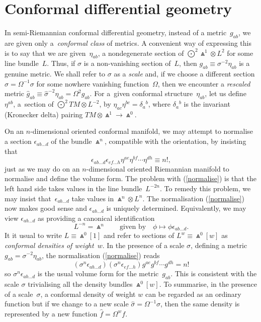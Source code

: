 \documentclass[pdftex]{sigma}%
\numberwithin{equation}{section}
\begin{document}
\section{Conformal differential geometry}\label{conf}
In semi-Riemannian conformal differential geometry, instead of a
metric~$g_{ab}$, we are given only a~{\em conformal class} of metrics. A
convenient way of expressing this is to say that we are given~$\eta_{ab}$, a
nondegenerate section of $\bigodot^2\!\Wedge^1\otimes L^2$ for some line
bundle~$L$. Thus, if $\sigma$ is a non-vanishing section of~$L$, then
$g_{ab}\equiv\sigma^{-2}\eta_{ab}$ is a genuine metric. We shall refer to
$\sigma$ as a {\em scale} and, if we choose a different section
$\widehat\sigma=\Omega^{-1}\sigma$ for some nowhere vanishing
function~$\Omega$, then we encounter a {\em rescaled} metric
$\widehat{g}_{ab}\equiv\widehat\sigma^{-2}\eta_{ab}=\Omega^2g_{ab}$. For a~given conformal structure~$\eta_{ab}$, let us define~$\eta^{ab}$, a~section of
$\bigodot^2\!TM\otimes L^{-2}$, by $\eta_{ac}\eta^{bc}=\delta_a{}^b$, where
$\delta_a{}^b$ is the invariant (Kronecker delta) pairing
$TM\otimes\Wedge^1\to\Wedge^0$.

On an $n$-dimensional oriented conformal manifold, we may attempt to normalise
a section $\epsilon_{ab\dots d}$ of the bundle $\Wedge^n$, compatible
with the orientation, by insisting that
\begin{equation}\label{normalise}
\epsilon_{ab\dots d}\epsilon_{ef\dots h}\eta^{ae}\eta^{bf}\cdots\eta^{dh}
\equiv n! ,\end{equation}
just as we may do on an $n$-dimensional oriented Riemannian manifold to
normalise and define the volume form. The problem with (\ref{normalise}) is
that the left hand side takes values in the line bundle~$L^{-2n}$. To remedy
this problem, we may insist that~$\epsilon_{ab\dots d}$ take values in
$\Wedge^n\otimes L^n$. The normalisation (\ref{normalise}) now makes good
sense and $\epsilon_{ab\dots d}$ is uniquely determined. Equivalently, we may
view $\epsilon_{ab\dots d}$ as providing a canonical identification
\[L^{-n}=\Wedge^n\qquad
\mbox{given by}\quad\phi\mapsto\phi\epsilon_{ab\dots d}.\]
It it usual to write $L\equiv\Wedge^0[1]$ and refer to sections of
$L^w\equiv\Wedge^0[w]$ as {\em conformal densities of weight}~$w$. In the
presence of a scale $\sigma$, defining a metric $g_{ab}=\sigma^{-2}\eta_{ab}$,
the normalisation (\ref{normalise}) reads
\[(\sigma^n\epsilon_{ab\dots d})(\sigma^n\epsilon_{ef\dots h})
g^{ae}g^{bf}\cdots g^{dh}=n!\]
so $\sigma^n\epsilon_{ab\dots d}$ is the usual volume form for the
metric~$g_{ab}$. This is consistent with the scale $\sigma$ trivialising
all the density bundles $\Wedge^0[w]$. To summarise, in the presence of a
scale~$\sigma$, a conformal density of weight $w$ can be regarded as an ordinary
function but if we change to a new scale $\widehat\sigma=\Omega^{-1}\sigma$,
then the same density is represented by a new function $\widehat{f}=\Omega^wf$.
\end{document}
